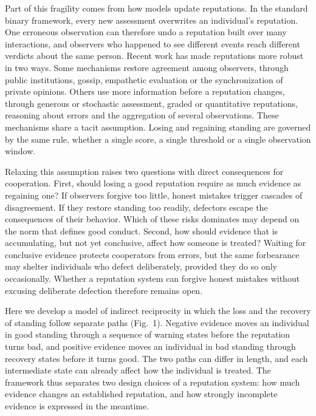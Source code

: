 \documentclass[11pt]{article}
\begin{document}
Part of this fragility comes from how models update reputations. In the standard binary framework, every new assessment overwrites an individual's reputation\cite{ohtsuki2004}. One erroneous observation can therefore undo a reputation built over many interactions, and observers who happened to see different events reach different verdicts about the same person\cite{hilbe2018,radzvilavicius2019}. Recent work has made reputations more robust in two ways. Some mechanisms restore agreement among observers, through public institutions, gossip, empathetic evaluation or the synchronization of private opinions\cite{radzvilavicius2021,kawakatsu2024,radzvilavicius2019,murase2024synchronization,tham2026,okada2024}. Others use more information before a reputation changes, through generous or stochastic assessment\cite{schmid2021,murase2023}, graded or quantitative reputations\cite{tanabe2013,murase2022,schmid2023,clark2020}, reasoning about errors\cite{pandula2024,morsky2024} and the aggregation of several observations\cite{michelmata2024}. These mechanisms share a tacit assumption. Losing and regaining standing are governed by the same rule, whether a single score, a single threshold or a single observation window\cite{schmid2023,michelmata2024,yamamoto2025}.

Relaxing this assumption raises two questions with direct consequences for cooperation. First, should losing a good reputation require as much evidence as regaining one? If observers forgive too little, honest mistakes trigger cascades of disagreement. If they restore standing too readily, defectors escape the consequences of their behavior. Which of these risks dominates may depend on the norm that defines good conduct. Second, how should evidence that is accumulating, but not yet conclusive, affect how someone is treated? Waiting for conclusive evidence protects cooperators from errors, but the same forbearance may shelter individuals who defect deliberately, provided they do so only occasionally\cite{schmid2021,michelmata2024}. Whether a reputation system can forgive honest mistakes without excusing deliberate defection therefore remains open.

Here we develop a model of indirect reciprocity in which the loss and the recovery of standing follow separate paths (Fig.~1). Negative evidence moves an individual in good standing through a sequence of warning states before the reputation turns bad, and positive evidence moves an individual in bad standing through recovery states before it turns good. The two paths can differ in length, and each intermediate state can already affect how the individual is treated. The framework thus separates two design choices of a reputation system: how much evidence changes an established reputation, and how strongly incomplete evidence is expressed in the meantime.
\end{document}
